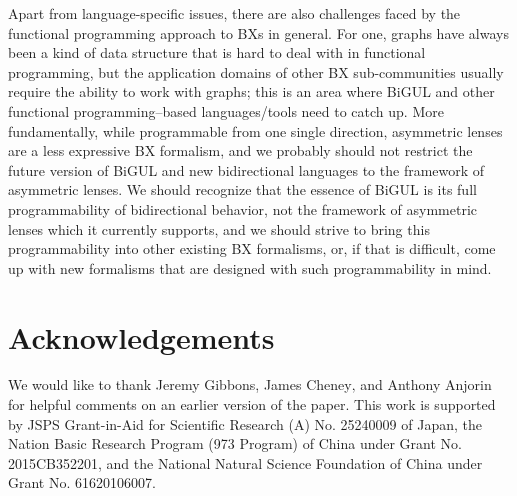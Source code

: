 Apart from language-specific issues, there are also challenges faced by the functional programming approach to BXs in general.
For one, graphs have always been a kind of data structure that is hard to deal with in functional programming, but the application domains of other BX sub-communities usually require the ability to work with graphs; this is an area where BiGUL and other functional programming--based languages/tools need to catch up.
More fundamentally, while programmable from one single direction, asymmetric lenses are a less expressive BX formalism, and we probably should not restrict the future version of BiGUL and new bidirectional languages to the framework of asymmetric lenses.
We should recognize that the essence of BiGUL is its full programmability of bidirectional behavior, not the framework of asymmetric lenses which it currently supports, and we should strive to bring this programmability into other existing BX formalisms, or, if that is difficult, come up with new formalisms that are designed with such programmability in mind.

\section*{Acknowledgements}

We would like to thank Jeremy Gibbons, James Cheney‚ and Anthony Anjorin 
for helpful comments on an earlier version of the paper. 
This work is supported by JSPS Grant-in-Aid for Scientific Research
(A) No. 25240009 of Japan, the Nation Basic Research Program (973
Program) of China under Grant No. 2015CB352201, and the National
Natural Science Foundation of China under Grant No. 61620106007.

